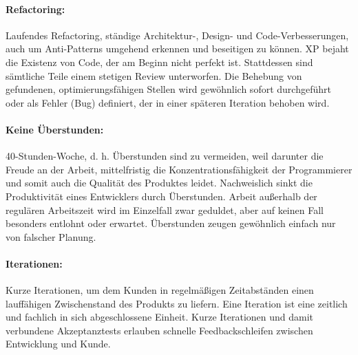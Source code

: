 \documentclass[fontsize=9pt,paper=a4,parskip=half,DIV=11,twocolumn]{scrartcl}
\begin{document}
\paragraph{Refactoring:} Laufendes Refactoring, ständige Architektur-, Design-
und Code-Verbesserungen, auch um Anti-Patterns umgehend erkennen und beseitigen zu
können. XP bejaht die Existenz von Code, der am Beginn nicht perfekt ist.
Stattdessen sind sämtliche Teile einem stetigen Review unterworfen. Die Behebung
von gefundenen, optimierungsfähigen Stellen wird gewöhnlich sofort durchgeführt
oder als Fehler (Bug) definiert, der in einer späteren Iteration behoben wird.

\paragraph{Keine Überstunden:} 40-Stunden-Woche, d. h. Überstunden sind zu
vermeiden, weil darunter die Freude an der Arbeit, mittelfristig die Konzentrationsfähigkeit der
Programmierer und somit auch die Qualität des Produktes leidet. Nachweislich
sinkt die Produktivität eines Entwicklers durch Überstunden. Arbeit außerhalb der
regulären Arbeitszeit wird im Einzelfall zwar geduldet, aber auf keinen Fall
besonders entlohnt oder erwartet. Überstunden zeugen gewöhnlich einfach nur von
falscher Planung.

\paragraph{Iterationen:} Kurze Iterationen, um dem Kunden in regelmäßigen
Zeitabständen einen lauffähigen Zwischenstand des Produkts zu liefern. Eine Iteration ist eine
zeitlich und fachlich in sich abgeschlossene Einheit. Kurze Iterationen und damit
verbundene Akzeptanztests erlauben schnelle Feedbackschleifen zwischen
Entwicklung und Kunde.

\end{document}
